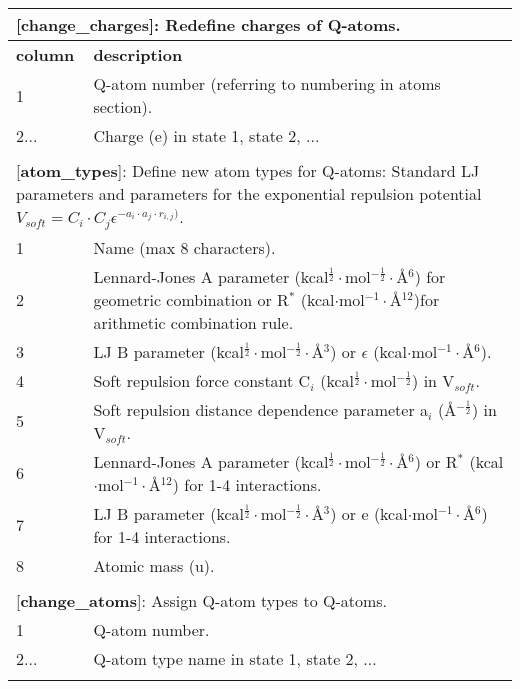 \documentclass[a4paper,10pt]{article}
\begin{document}
\begin{longtable}{|p{53pt}|p{181pt}|p{160pt}|}
\multicolumn{3}{p{394pt}}{[\textbf{change\_charges}]: Redefine charges of Q-atoms.}\\
\hline \textbf{column} & \multicolumn{2}{p{341pt}|}{\textbf{description}}\\
\hline 1 & \multicolumn{2}{p{341pt}|}{Q-atom number (referring to numbering in atoms section).}\\
\hline 2... & \multicolumn{2}{p{341pt}|}{Charge (e) in state 1, state 2, ...}\\
\hline
\multicolumn{3}{p{394pt}}{}\\

\multicolumn{3}{p{394pt}}{[\textbf{atom\_types}]: Define new atom types for Q-atoms: Standard LJ parameters and parameters for the exponential repulsion potential $V_{soft} = C_i\cdot C_j\epsilon^{-a_i\cdot a_j\cdot r_{i,j})}$.}\\
\hline 1 & \multicolumn{2}{p{341pt}|}{Name (max 8 characters).}\\
\hline 2 & \multicolumn{2}{p{341pt}|}{Lennard-Jones A parameter (kcal$^{\frac{1}{2}}\cdot$mol$^{-\frac{1}{2}}\cdot$\AA$^{6}$) for geometric combination or R$^*$ (kcal$\cdot$mol$^{-1}\cdot$\AA$^{12}$)for arithmetic combination rule.}\\
\hline 3 & \multicolumn{2}{p{341pt}|}{LJ B parameter (kcal$^{\frac{1}{2}}\cdot$mol$^{-\frac{1}{2}}\cdot$\AA$^{3}$) or $\epsilon$ (kcal$\cdot$mol$^{-1}\cdot$\AA$^{6}$).}\\
\hline 4 & \multicolumn{2}{p{341pt}|}{Soft repulsion force constant C$_i$ (kcal$^{\frac{1}{2}}\cdot$mol$^{-\frac{1}{2}}$) in V$_{soft}$.}\\
\hline 5 & \multicolumn{2}{p{341pt}|}{Soft repulsion distance dependence parameter a$_i$ (\AA$^{-\frac{1}{2}}$) in V$_{soft}$.}\\
\hline 6 & \multicolumn{2}{p{341pt}|}{Lennard-Jones A parameter (kcal$^{\frac{1}{2}}\cdot$mol$^{-\frac{1}{2}}\cdot$\AA$^{6}$) or R$^*$ (kcal$\cdot$mol$^{-1}\cdot$\AA$^{12}$) for 1-4 interactions.}\\
\hline 7 & \multicolumn{2}{p{341pt}|}{LJ B parameter (kcal$^{\frac{1}{2}}\cdot$mol$^{-\frac{1}{2}}\cdot$\AA$^{3}$) or e (kcal$\cdot$mol$^{-1}\cdot$\AA$^{6}$) for 1-4 interactions.}\\
\hline 8 & \multicolumn{2}{p{341pt}|}{Atomic mass (u).}\\
\hline
\multicolumn{3}{p{394pt}}{}\\

\multicolumn{3}{p{394pt}}{[\textbf{change\_atoms}]: Assign Q-atom types to Q-atoms.}\\
\hline 1 & \multicolumn{2}{p{341pt}|}{Q-atom number.}\\
\hline 2... & \multicolumn{2}{p{341pt}|}{Q-atom type name in state 1, state 2, ...}\\
\hline
\multicolumn{3}{p{394pt}}{}\\


\end{longtable}
\end{document}
